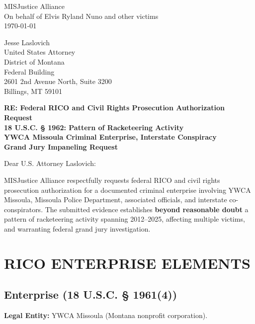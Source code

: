 \documentclass[12pt,oneside]{article}
\begin{document}
\begin{flushleft}

MISJustice Alliance \\
On behalf of Elvis Ryland Nuno and other victims \\
\today

\vspace{0.3in}

Jesse Laslovich \\
United States Attorney \\
District of Montana \\
Federal Building \\
2601 2nd Avenue North, Suite 3200 \\
Billings, MT 59101

\vspace{0.3in}

\textbf{RE: Federal RICO and Civil Rights Prosecution Authorization Request} \\
\textbf{18 U.S.C. § 1962: Pattern of Racketeering Activity} \\
\textbf{YWCA Missoula Criminal Enterprise, Interstate Conspiracy} \\
\textbf{Grand Jury Impaneling Request}

\vspace{0.3in}

Dear U.S. Attorney Laslovich:

\vspace{0.2in}

MISJustice Alliance respectfully requests federal RICO and civil rights prosecution authorization for a documented criminal enterprise involving YWCA Missoula, Missoula Police Department, associated officials, and interstate co-conspirators. The submitted evidence establishes \textbf{beyond reasonable doubt} a pattern of racketeering activity spanning 2012--2025, affecting multiple victims, and warranting federal grand jury investigation.

\section*{RICO ENTERPRISE ELEMENTS}

\subsection*{Enterprise (18 U.S.C. § 1961(4))}

\textbf{Legal Entity:} YWCA Missoula (Montana nonprofit corporation).


\end{flushleft}
\end{document}
